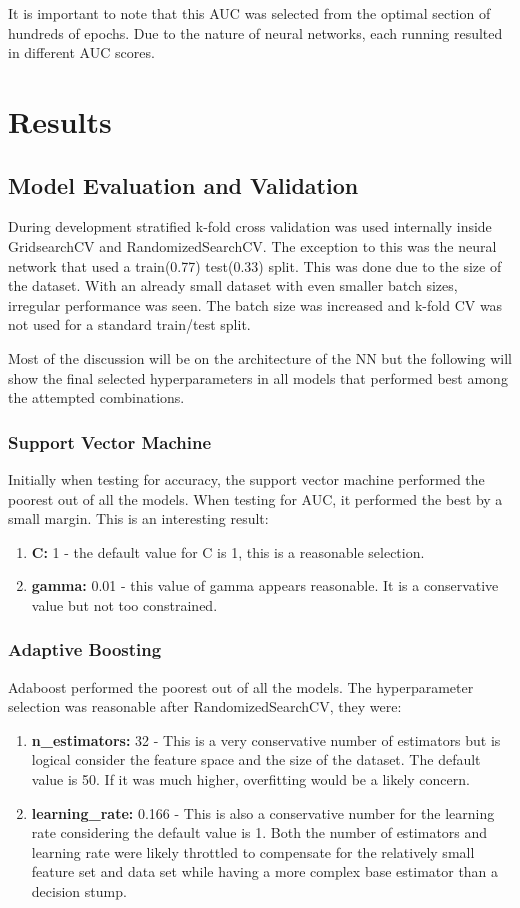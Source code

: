 \documentclass[11pt]{article}
\begin{document}
	It is important to note that this AUC was selected from the optimal section of hundreds of epochs. Due to the nature of neural networks, each running resulted in different AUC scores.
	
	\section{Results}
	\subsection{Model Evaluation and Validation}
	During development stratified k-fold cross validation was used internally inside GridsearchCV and RandomizedSearchCV. The exception to this was the neural network that used a train(0.77) test(0.33) split. This was done due to the size of the dataset. With an already small dataset with even smaller batch sizes, irregular performance was seen. The batch size was increased and k-fold CV was not used for a standard train/test split.
	
	Most of the discussion will be on the architecture of the NN but the following will show the final selected hyperparameters in all models that performed best among the attempted combinations.
	
	\subsubsection{Support Vector Machine}
	Initially when testing for accuracy, the support vector machine performed the poorest out of all the models. When testing for AUC, it performed the best by a small margin. This is an interesting result:
	
	\begin{enumerate}
		\item \textbf{C:} 1 - the default value for C is 1, this is a reasonable selection.
		\item \textbf{gamma:} 0.01 - this value of gamma appears reasonable. It is a conservative value but not too constrained.
	\end{enumerate}
	
	\subsubsection{Adaptive Boosting}
	Adaboost performed the poorest out of all the models. The hyperparameter selection was reasonable after RandomizedSearchCV, they were:

	\begin{enumerate}
		\item \textbf{n\_estimators:} 32 - This is a very conservative number of estimators but is logical consider the feature space and the size of the dataset. The default value is 50. If it was much higher, overfitting would be a likely concern.
		\item \textbf{learning\_rate:} 0.166 - This is also a conservative number for the learning rate considering the default value is 1. Both the number of estimators and learning rate were likely throttled to compensate for the relatively small feature set and data set while having a more complex base estimator than a decision stump.
	\end{enumerate}
\end{document}
